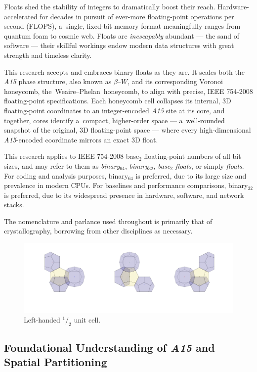 \documentclass[10pt]{article}
\def\AAAB{\textit{A15}}
\def\tWPh{the~Weaire--Phelan~honeycomb}
\begin{document}
Floats shed the stability of integers to dramatically boost their reach. Hardware-accelerated for decades in pursuit of ever-more
floating-point operations per second (FLOPS), a~single, fixed-bit memory format meaningfully ranges from quantum foam to cosmic
web. Floats are \emph{inescapably} abundant --- the sand of software --- their skillful workings endow modern data structures with
great strength and timeless clarity.

This research accepts and embraces binary floats as they are. It scales both the \AAAB{} phase structure, also known as
$\beta$--$W$, and its corresponding Voronoi honeycomb, \tWPh, to align with precise, IEEE 754-2008 floating-point specifications.
Each honeycomb cell collapses its internal, 3D floating-point coordinates to an integer-encoded \AAAB{} site at its core, and
together, cores identify a~compact, higher-order space --- a~well-rounded snapshot of the original, 3D floating-point space --- where
every high-dimensional \AAAB-encoded coordinate mirrors an exact 3D float.

This research applies to IEEE 754-2008 base$_{2}$ floating-point numbers of all bit sizes, and may refer to them as
\emph{binary$_{64}$}, \emph{binary$_{32}$}, \emph{base$_{2}$ floats}, or simply \emph{floats}. For coding and analysis purposes,
binary$_{64}$ is preferred, due to its large size and prevalence in modern CPUs. For baselines and performance comparisons,
binary$_{32}$ is preferred, due to its widespread presence in hardware, software, and network stacks.

The nomenclature and parlance used throughout is primarily that of crystallography, borrowing from other disciplines as
necessary.

\begin{figure}[!ht]\capstart \includegraphics[trim=25 50 25 0,scale=.55]{fig-cell2}\caption{Left-handed $^1/_2$ unit cell.
\label{fig-cell2}}\end{figure}

\subsection{Foundational Understanding of \AAAB{} and Spatial Partitioning}\label{foundational-understanding-of-a15-and-spatial-partitioning}
\end{document}
